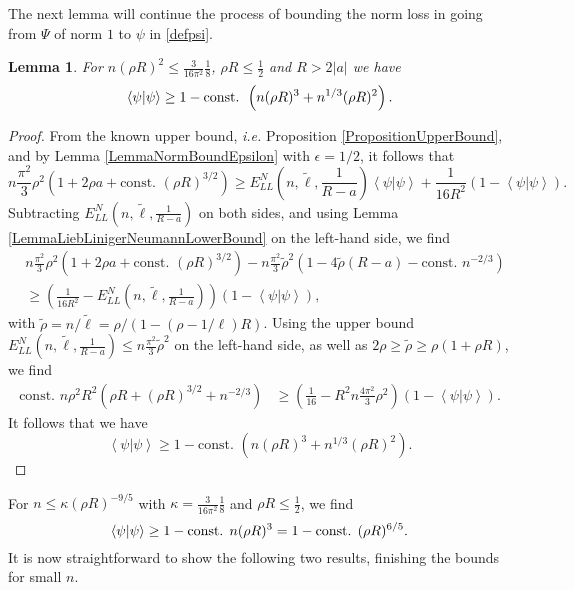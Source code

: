 \documentclass[a4paper,11pt]{article}
\newcommand{\abs}[1]{\left\lvert #1 \right\rvert}
\renewcommand{\braket}[1]{\left\langle#1\right\rangle}
\newcommand{\ie}{\emph{i.e.} }
\newtheorem{lemma}[theorem]{Lemma}
\numberwithin{equation}{section}
\begin{document}
	
	The next lemma will continue the process of bounding the norm loss in going from $ \Psi $ of norm $ 1 $ to $ \psi $ in \eqref{defpsi}. 
	\begin{lemma}\label{LemmaImprovedMassBound}
	For $ n(\rho R)^2\leq  \frac{3}{16\pi^2}\frac{1}{8} $, $ \rho R\leq \frac{1}{2} $ and $ R>2\abs{a} $ we have
		\begin{equation}\label{EqImprovedMassBound}
		\begin{aligned}
		\braket{\psi|\psi} \geq 1-\textnormal{const. }\left(n(\rho R)^3+n^{1/3}(\rho R)^2\right).
		\end{aligned}
		\end{equation}
	\end{lemma}
	\begin{proof}
		From the known upper bound, \ie Proposition \ref{PropositionUpperBound}, and by Lemma \ref{LemmaNormBoundEpsilon} with $ \epsilon=1/2 $, it follows that 
		\begin{equation}
		n\frac{\pi^2}{3}\rho^2\left(1+2\rho a+\text{const. }(\rho R)^{3/2}\right)\geq E_{LL}^N \left(n,\tilde{\ell},\frac{1}{R-a}\right)\braket{\psi|\psi}+ \frac{1}{16R^2}(1-\braket{\psi|\psi}).
		\end{equation}
		Subtracting $ E_{LL}^N \left(n,\tilde{\ell},\frac{1}{R-a}\right) $ on both sides, and using Lemma \ref{LemmaLiebLinigerNeumannLowerBound} on the left-hand side, we find\begin{equation}
		\begin{aligned}
		&n\frac{\pi^2}{3}\rho^2\left(1+2\rho a+\text{const. }(\rho R)^{3/2}\right)-n\frac{\pi^2}{3}\tilde{\rho}^2\left(1-4\tilde{\rho} (R-a)-\text{const. }n^{-2/3}\right)\\
		&\geq  \left(\frac{1}{16R^2}-E_{LL}^N \left(n,\tilde{\ell},\frac{1}{R-a}\right)\right)(1-\braket{\psi|\psi}),
		\end{aligned}
		\end{equation}
		with $ \tilde{\rho}=n/\tilde{\ell}=\rho/(1-(\rho-1/\ell)R)$.
		Using the upper bound $ E^N_{LL}\left(n,\tilde{\ell},\frac{1}{R-a}\right)\leq n\frac{\pi^2}{3}\tilde{\rho}^2 $ on the left-hand side, as well as $ 2\rho \geq\tilde{\rho}\geq \rho(1+\rho R)$, we find
		\begin{equation}
		\begin{aligned}
		\text{const. }n\rho^2R^2\left(\rho R+(\rho R)^{3/2}+n^{-2/3}\right)&\geq \left(\frac{1}{16}-R^2n\frac{4\pi^2}{3}\rho^2\right)\left(1-\braket{\psi|\psi}\right).
		\end{aligned}
		\end{equation}
		It follows that we have \begin{equation}
		\braket{\psi|\psi}\geq 1-\text{const. }\left(n(\rho R)^3+n^{1/3}(\rho R)^2\right).
		\end{equation}
	\end{proof}
		For $ n\leq \kappa (\rho R)^{-9/5} $ with $ \kappa=\frac{3}{16\pi^2}\frac{1}{8} $ and $ \rho R\leq \frac{1}{2} $, we find \begin{equation}
		\braket{\psi|\psi}\geq 1-\textnormal{const. }n(\rho R)^3=1-\textnormal{const. }(\rho R)^{6/5}.
		\end{equation}
    It is now straightforward to show the following two results, finishing the bounds for small $n$.
	
\end{document}
